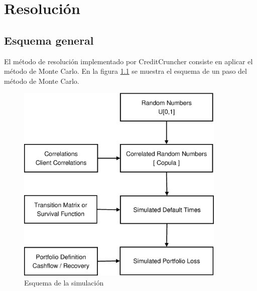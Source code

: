 
%
%
%
%
%
%
%
%
%

\chapter{Resoluci\'on}
\label{sec:resolution}

\section{Esquema general}

El m\'etodo de resoluci\'on implementado por CreditCruncher consiste en
aplicar el m\'etodo de Monte Carlo. En la figura \ref{fig:esquema1} se
muestra el esquema de un paso del m\'etodo de Monte Carlo.

\begin{figure}[!hb]
\begin{center}
\includegraphics[width=10cm,angle=0]{./images/esquema1.eps}
\caption{Esquema de la simulaci\'on}
\label{fig:esquema1}
\end{center}
\end{figure}

